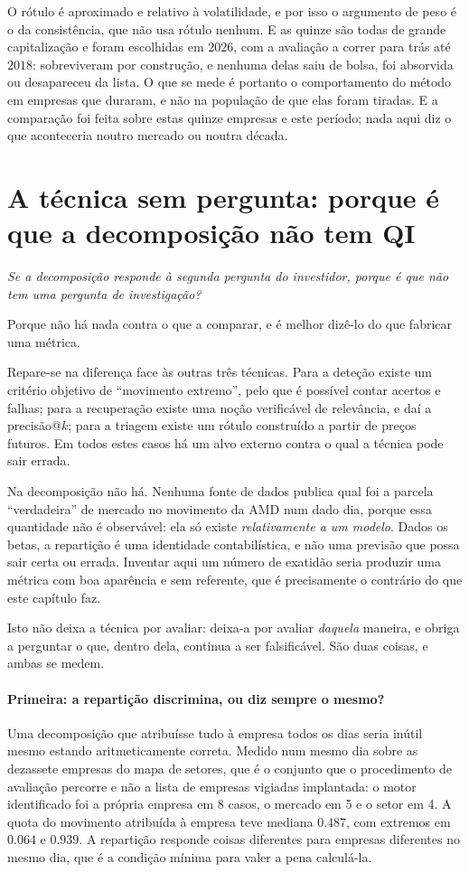 O rótulo é aproximado e relativo à volatilidade, e por isso o argumento de peso é o da consistência,
que não usa rótulo nenhum. E as quinze são todas de grande capitalização e foram escolhidas em
$2026$, com a avaliação a correr para trás até $2018$: sobreviveram por construção, e nenhuma delas
saiu de bolsa, foi absorvida ou desapareceu da lista. O que se mede é portanto o comportamento do
método em empresas que duraram, e não na população de que elas foram tiradas. E a comparação foi feita sobre estas quinze empresas e este período; nada
aqui diz o que aconteceria noutro mercado ou noutra década.

\section{A técnica sem pergunta: porque é que a decomposição não tem QI}
\label{sec:av_decomposicao}

\emph{Se a decomposição responde à segunda pergunta do investidor, porque é que não tem uma pergunta
de investigação?}

Porque não há nada contra o que a comparar, e é melhor dizê-lo do que fabricar uma métrica.

Repare-se na diferença face às outras três técnicas. Para a deteção existe um critério objetivo de
``movimento extremo'', pelo que é possível contar acertos e falhas; para a recuperação existe uma
noção verificável de relevância, e daí a precisão@$k$; para a triagem existe um rótulo construído a
partir de preços futuros. Em todos estes casos há um alvo externo contra o qual a técnica pode
sair errada.

Na decomposição não há. Nenhuma fonte de dados publica qual foi a parcela ``verdadeira'' de mercado
no movimento da AMD num dado dia, porque essa quantidade não é observável: ela só existe
\emph{relativamente a um modelo}. Dados os betas, a repartição é uma identidade contabilística, e não
uma previsão que possa sair certa ou errada. Inventar aqui um número de exatidão seria produzir uma
métrica com boa aparência e sem referente, que é precisamente o contrário do que este capítulo faz.

Isto não deixa a técnica por avaliar: deixa-a por avaliar \emph{daquela} maneira, e obriga a
perguntar o que, dentro dela, continua a ser falsificável. São duas coisas, e ambas se medem.

\paragraph{Primeira: a repartição discrimina, ou diz sempre o mesmo?}
Uma decomposição que atribuísse tudo à empresa todos os dias seria inútil mesmo estando
aritmeticamente correta. Medido num mesmo dia sobre as dezassete empresas do mapa de setores, que é o conjunto que o procedimento de avaliação percorre e não a lista de empresas vigiadas implantada: o motor identificado foi a
própria empresa em 8 casos, o mercado em 5 e o setor em 4. A quota do movimento atribuída à empresa
teve mediana $0.487$, com extremos em $0.064$ e $0.939$. A repartição responde coisas diferentes para
empresas diferentes no mesmo dia, que é a condição mínima para valer a pena calculá-la.

